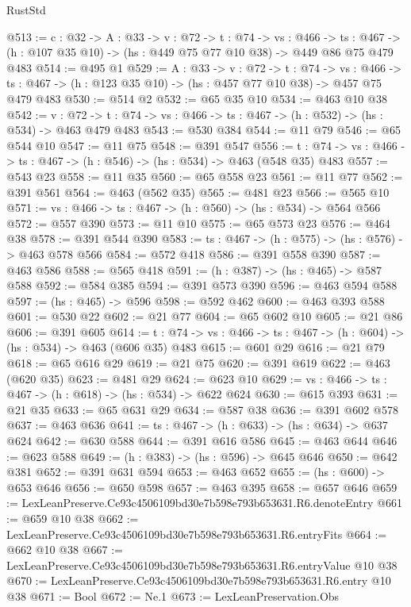 \begin{lexlean}{RustStd}
\begin{coremodule}
@513 := {c : @32} ->
  {A : @33} ->
  {v : @72} ->
  {t : @74} ->
  {vs : @466} ->
  {ts : @467} -> (h : @107 @35 @10) -> (hs : @449 @75 @77 @10 @38) -> @449 @86 @75 @479 @483
@514 := @495 @1
@529 := {A : @33} ->
  {v : @72} ->
  {t : @74} ->
  {vs : @466} -> {ts : @467} -> (h : @123 @35 @10) -> (hs : @457 @77 @10 @38) -> @457 @75 @479 @483
@530 := @514 @2
@532 := @65 @35 @10
@534 := @463 @10 @38
@542 := {v : @72} ->
  {t : @74} -> {vs : @466} -> {ts : @467} -> (h : @532) -> (hs : @534) -> @463 @479 @483
@543 := @530 @384
@544 := @11 @79
@546 := @65 @544 @10
@547 := @11 @75
@548 := @391 @547
@556 := {t : @74} -> {vs : @466} -> {ts : @467} -> (h : @546) -> (hs : @534) -> @463 (@548 @35) @483
@557 := @543 @23
@558 := @11 @35
@560 := @65 @558 @23
@561 := @11 @77
@562 := @391 @561
@564 := @463 (@562 @35)
@565 := @481 @23
@566 := @565 @10
@571 := {vs : @466} -> {ts : @467} -> (h : @560) -> (hs : @534) -> @564 @566
@572 := @557 @390
@573 := @11 @10
@575 := @65 @573 @23
@576 := @464 @38
@578 := @391 @544 @390
@583 := {ts : @467} -> (h : @575) -> (hs : @576) -> @463 @578 @566
@584 := @572 @418
@586 := @391 @558 @390
@587 := @463 @586
@588 := @565 @418
@591 := (h : @387) -> (hs : @465) -> @587 @588
@592 := @584 @385
@594 := @391 @573 @390
@596 := @463 @594 @588
@597 := (hs : @465) -> @596
@598 := @592 @462
@600 := @463 @393 @588
@601 := @530 @22
@602 := @21 @77
@604 := @65 @602 @10
@605 := @21 @86
@606 := @391 @605
@614 := {t : @74} -> {vs : @466} -> {ts : @467} -> (h : @604) -> (hs : @534) -> @463 (@606 @35) @483
@615 := @601 @29
@616 := @21 @79
@618 := @65 @616 @29
@619 := @21 @75
@620 := @391 @619
@622 := @463 (@620 @35)
@623 := @481 @29
@624 := @623 @10
@629 := {vs : @466} -> {ts : @467} -> (h : @618) -> (hs : @534) -> @622 @624
@630 := @615 @393
@631 := @21 @35
@633 := @65 @631 @29
@634 := @587 @38
@636 := @391 @602 @578
@637 := @463 @636
@641 := {ts : @467} -> (h : @633) -> (hs : @634) -> @637 @624
@642 := @630 @588
@644 := @391 @616 @586
@645 := @463 @644
@646 := @623 @588
@649 := (h : @383) -> (hs : @596) -> @645 @646
@650 := @642 @381
@652 := @391 @631 @594
@653 := @463 @652
@655 := (hs : @600) -> @653 @646
@656 := @650 @598
@657 := @463 @395
@658 := @657 @646
@659 := LexLeanPreserve.Ce93c4506109bd30e7b598e793b653631.R6.denoteEntry
@661 := @659 @10 @38
@662 := LexLeanPreserve.Ce93c4506109bd30e7b598e793b653631.R6.entryFits
@664 := @662 @10 @38
@667 := LexLeanPreserve.Ce93c4506109bd30e7b598e793b653631.R6.entryValue @10 @38
@670 := LexLeanPreserve.Ce93c4506109bd30e7b598e793b653631.R6.entry @10 @38
@671 := Bool
@672 := Ne.{1}
@673 := LexLeanPreservation.Obs

\end{coremodule}
\end{lexlean}
